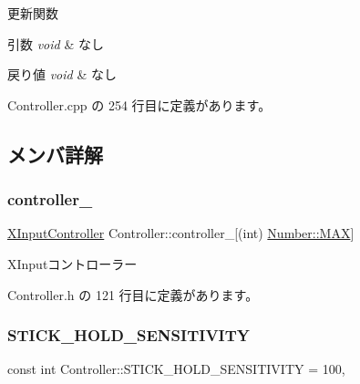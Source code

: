 更新関数 


\begin{DoxyParams}{引数}
{\em void} & なし \\
\hline
\end{DoxyParams}

\begin{DoxyRetVals}{戻り値}
{\em void} & なし \\
\hline
\end{DoxyRetVals}


 Controller.\+cpp の 254 行目に定義があります。



\subsection{メンバ詳解}
\mbox{\label{class_controller_a8f71d4e54911c80ea0c113f4b72ccfec}} 
\subsubsection{\texorpdfstring{controller\+\_\+}{controller\_}}
{\footnotesize\ttfamily \mbox{\hyperlink{class_controller_1_1_x_input_controller}{X\+Input\+Controller}} Controller\+::controller\+\_\+\mbox{[}(int) \mbox{\hyperlink{class_controller_ad81882021d5a5c77855c7d656899cc62a26a4b44a837bf97b972628509912b4a5}{Number\+::\+M\+AX}}\mbox{]}\hspace{0.3cm}{\ttfamily [private]}}



X\+Inputコントローラー 



 Controller.\+h の 121 行目に定義があります。

\mbox{\label{class_controller_a52591fcc8144e0fb274c6a42b5593e1b}} 
\subsubsection{\texorpdfstring{S\+T\+I\+C\+K\+\_\+\+H\+O\+L\+D\+\_\+\+S\+E\+N\+S\+I\+T\+I\+V\+I\+TY}{STICK\_HOLD\_SENSITIVITY}}
{\footnotesize\ttfamily const int Controller\+::\+S\+T\+I\+C\+K\+\_\+\+H\+O\+L\+D\+\_\+\+S\+E\+N\+S\+I\+T\+I\+V\+I\+TY = 100\hspace{0.3cm}{\ttfamily [static]}, {\ttfamily [private]}}



